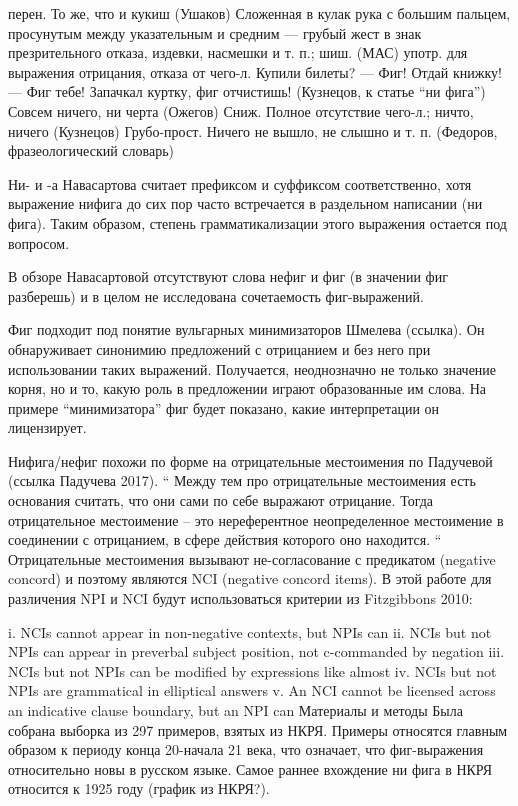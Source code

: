 \documentclass{article}
\begin{document}
перен. То же, что и кукиш (Ушаков)
Сложенная в кулак рука с большим пальцем, просунутым между указательным и средним — грубый жест в знак презрительного отказа, издевки, насмешки и т. п.; шиш. (МАС)
употр. для выражения отрицания, отказа от чего-л. Купили билеты? — Фиг! Отдай книжку! — Фиг тебе! Запачкал куртку, фиг отчистишь! (Кузнецов, к статье “ни фига”)
Совсем ничего, ни черта (Ожегов)
Сниж. Полное отсутствие чего-л.; ничто, ничего (Кузнецов)
Грубо-прост. Ничего не вышло, не слышно и т. п. (Федоров, фразеологический словарь)

Ни- и -а Навасартова считает префиксом и суффиксом соответственно, хотя выражение нифига до сих пор часто встречается в раздельном написании (ни фига). Таким образом, степень грамматикализации этого выражения остается под вопросом.

В обзоре Навасартовой отсутствуют слова нефиг и фиг (в значении фиг разберешь) и в целом не исследована сочетаемость фиг-выражений.

Фиг подходит под понятие вульгарных минимизаторов Шмелева (ссылка). Он обнаруживает синонимию предложений с отрицанием и без него при использовании таких выражений. Получается, неоднозначно не только значение корня, но и то, какую роль в предложении играют образованные им слова. На примере “минимизатора” фиг будет показано, какие интерпретации он лицензирует.

Нифига/нефиг похожи по форме на отрицательные местоимения по Падучевой (ссылка Падучева 2017).
“
Между тем про отрицательные местоимения есть основания считать, что они сами по себе выражают отрицание. Тогда отрицательное местоимение – это нереферентное неопределенное местоимение в соединении с отрицанием, в сфере действия которого оно находится.
“
Отрицательные местоимения вызывают не-согласование с предикатом (negative concord) и поэтому являются NCI (negative concord items). В этой работе для различения NPI и NCI будут использоваться критерии из Fitzgibbons 2010:

 i. NCIs cannot appear in non-negative contexts, but NPIs can
ii. NCIs but not NPIs can appear in preverbal subject position, not c-commanded by negation
 iii. NCIs but not NPIs can be modified by expressions like almost
iv. NCIs but not NPIs are grammatical in elliptical answers
v. An NCI cannot be licensed across an indicative clause boundary, but an NPI can
Материалы и методы
Была собрана выборка из 297 примеров, взятых из НКРЯ. Примеры относятся главным образом к периоду конца 20-начала 21 века, что означает, что фиг-выражения относительно новы в русском языке. Самое раннее вхождение ни фига в НКРЯ относится к 1925 году (график из НКРЯ?).
\end{document}
